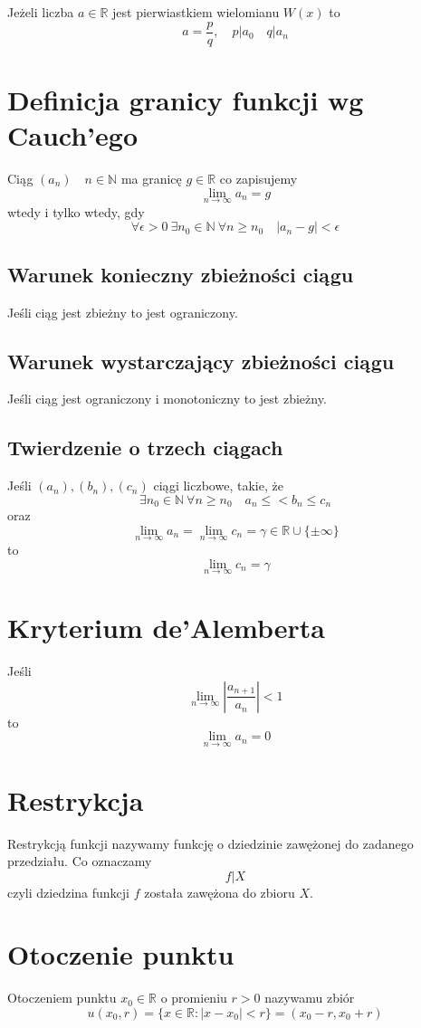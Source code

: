 \documentclass[11pt]{article}
\begin{document}
Jeżeli liczba $a \in \mathbb{R}$ jest pierwiastkiem wielomianu $W(x)$ to 
$$ a = \frac{p}{q} , \quad p | a_0 \quad q | a_n$$

\section{Definicja granicy funkcji wg Cauch'ego}
Ciąg $(a_n) \quad n \in \mathbb{N}$ ma granicę $ g \in \mathbb{R}$ co zapisujemy
$$ \lim_{n \to \infty} a_n = g$$ wtedy i tylko wtedy, gdy
$$ \forall \epsilon > 0\ \exists n_0 \in \mathbb{N}\ \forall n \geq n_0 \quad | a_n - g| < \epsilon $$

\subsection{Warunek konieczny zbieżności ciągu}
Jeśli ciąg jest zbieżny to jest ograniczony.
\subsection{Warunek wystarczający zbieżności ciągu}
Jeśli ciąg jest ograniczony i monotoniczny to jest zbieżny.

\subsection{Twierdzenie o trzech ciągach}
Jeśli $(a_n),(b_n),(c_n)$ ciągi liczbowe, takie, że $$ \exists n_0 \in \mathbb{N}\ \forall n \geq n_0 \quad a_n \leq < b_n \leq c_n$$
oraz $$ \lim_{n \to \infty}{a_n} = \lim_{n \to \infty}{c_n} = \gamma \in \mathbb{R} \cup \{ \pm \infty \}$$ to $$ \lim_{n \to \infty}{{c_n} = \gamma}$$

\section{Kryterium de'Alemberta}
Jeśli $$ \lim_{n \to \infty}{\left|\frac{a_{n+1}}{a_n}\right|} < 1$$ to $$ \lim_{n \to \infty}{a_n} = 0 $$

\section{Restrykcja}
Restrykcją funkcji nazywamy funkcję o dziedzinie zawężonej do zadanego przedziału. Co oznaczamy $$ f | X$$
czyli dziedzina funkcji $f$ została zawężona do zbioru $X$.

\section{Otoczenie punktu}
Otoczeniem punktu $x_0 \in \mathbb{R}$ o promieniu $ r >0$ nazywamu zbiór $$u(x_0,r) = \{x \in \mathbb{R} :  |x - x_0| < r\} = (x_0 - r, x_0 + r)$$
\end{document}
